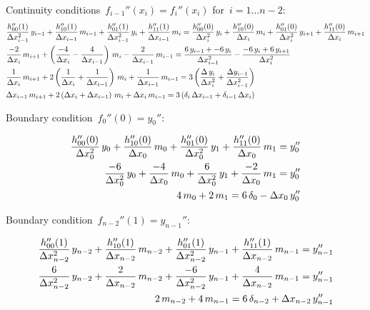 
Continuity conditions~$f_{i-1}''(x_{i}) = f_{i}''(x_{i})$ for~$i = 1 \ldots n-2$:
%
\begin{align}
&\frac{h_{00}''(1)}{\Delta x_{i-1}^2}\,y_{i-1} + \frac{h_{10}''(1)}{\Delta x_{i-1}}\,m_{i-1} + \frac{h_{01}''(1)}{\Delta x_{i-1}^2}\,y_{i} + \frac{h_{11}''(1)}{\Delta x_{i-1}}\,m_{i} = \frac{h_{00}''(0)}{\Delta x_{i}^2}\,y_{i} + \frac{h_{10}''(0)}{\Delta x_{i}}\,m_{i} + \frac{h_{01}''(0)}{\Delta x_{i}^2}\,y_{i+1} + \frac{h_{11}''(0)}{\Delta x_{i}}\,m_{i+1} \notag \\
&\frac{-2}{\Delta x_{i}}\,m_{i+1} + \left(\frac{-4}{\Delta x_{i}} - \frac{4}{\Delta x_{i-1}}\right)\,m_{i} - \frac{2}{\Delta x_{i-1}}\,m_{i-1} = \frac{6\,y_{i-1} + -6\,y_{i}}{\Delta x_{i-1}^2} - \frac{-6\,y_{i} + 6\,y_{i+1}}{\Delta x_{i}^2} \notag \\
&\frac{1}{\Delta x_{i}}\,m_{i+1} + 2\left(\frac{1}{\Delta x_{i}} + \frac{1}{\Delta x_{i-1}}\right)\,m_{i} + \frac{1}{\Delta x_{i-1}}\,m_{i-1} = 3\left(\frac{\Delta\,y_{i}}{\Delta x_{i}^2} + \frac{\Delta y_{i-1}}{\Delta x_{i-1}^2}\right) \notag \\
&\Delta x_{i-1}\,m_{i+1} + 2\left(\Delta x_{i} + \Delta x_{i-1}\right)\,m_{i} + \Delta x_{i}\,m_{i-1} = 3\left(\delta_{i}\,\Delta x_{i-1} + \delta_{i-1}\,\Delta x_{i}\right)
\end{align}

Boundary condition~$f_{0}''(0) = y_{0}''$:

\begin{align}
\frac{h_{00}''(0)}{\Delta x_{0}^2}\,y_{0} + \frac{h_{10}''(0)}{\Delta x_{0}}\,m_{0} + \frac{h_{01}''(0)}{\Delta x_{0}^2}\,y_{1} + \frac{h_{11}''(0)}{\Delta x_{0}}\,m_{1} = y_{0}''& \notag \\
\frac{-6}{\Delta x_{0}^2}\,y_{0} + \frac{-4}{\Delta x_{0}}\,m_{0} + \frac{6}{\Delta x_{0}^2}\,y_{1} + \frac{-2}{\Delta x_{0}}\,m_{1} = y_{0}''& \notag \\
4\,m_{0} + 2\,m_{1} = 6\,\delta_{0} - \Delta x_{0}\,y_{0}''&
\end{align}

Boundary condition~$f_{n-2}''(1) = y_{n-1}''$:

\begin{align}
\frac{h_{00}''(1)}{\Delta x_{n-2}^2}\,y_{n-2} + \frac{h_{10}''(1)}{\Delta x_{n-2}}\,m_{n-2} + \frac{h_{01}''(1)}{\Delta x_{n-2}^2}\,y_{n-1} + \frac{h_{11}''(1)}{\Delta x_{n-2}}\,m_{n-1} = y_{n-1}''& \notag \\
\frac{6}{\Delta x_{n-2}^2}\,y_{n-2} + \frac{2}{\Delta x_{n-2}}\,m_{n-2} + \frac{-6}{\Delta x_{n-2}^2}\,y_{n-1} + \frac{4}{\Delta x_{n-2}}\,m_{n-1} = y_{n-1}''& \notag \\
2\,m_{n-2} + 4\,m_{n-1} = 6\,\delta_{n-2} + \Delta x_{n-2}\,y_{n-1}''&
\end{align}

